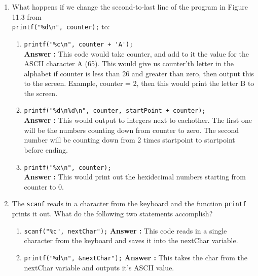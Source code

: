 \documentclass[a4paper,11pt]{article}
\newcommand{\answer}{\textbf{Answer : }}
\begin{document}
\begin{enumerate}
\item What happens if we change the second-to-last line of the program in Figure 11.3 from \\ \verb.printf("%d\n", counter);. to:
\begin{enumerate}
\item \verb.printf("%c\n", counter + 'A');. \\
\answer This code would take counter, and add to it the value for the ASCII character A (65). This would give us counter'th letter in the alphabet if counter is less than 26 and greater than zero, then output this to the screen. Example, counter = 2, then this would print the letter B to the screen.
\item \verb.printf("%d\n%d\n", counter, startPoint + counter);. \\
\answer This would output to integers next to eachother. The first one will be the numbers counting down from counter to zero. The second number will be counting down from 2 times startpoint to startpoint before ending.
\item \verb.printf("%x\n", counter);. \\
\answer This would print out the hexidecimal numbers starting from counter to 0.
\end{enumerate}

\item The \verb.scanf. reads in a character from the keyboard and the function \verb.printf. prints it out. What do the following two statements accomplish?
\begin{enumerate}
\item  \verb.scanf("%c", nextChar");. \answer This code reads in a single character from the keyboard and saves it into the nextChar variable.
\item \verb.printf("%d\n", &nextChar");. \answer This takes the char from the nextChar variable and outputs it's ASCII value.
\end{enumerate}


\end{enumerate}
\end{document}

